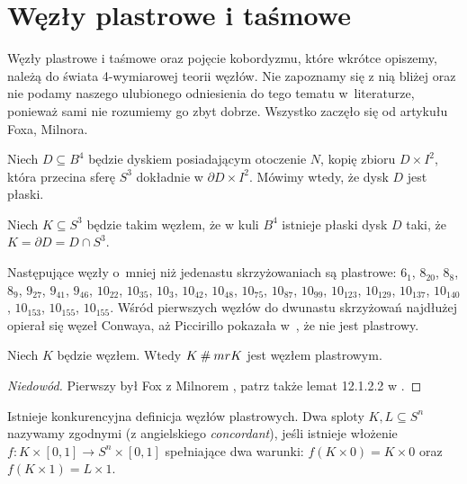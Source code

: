 \section{Węzły plastrowe i taśmowe} %
\label{sec:slice}
Węzły plastrowe i taśmowe oraz pojęcie kobordyzmu, które wkrótce opiszemy, należą do świata 4-wymiarowej teorii węzłów.
Nie zapoznamy się z nią bliżej oraz nie podamy naszego ulubionego odniesienia do tego tematu w~literaturze, ponieważ sami nie rozumiemy go zbyt dobrze.
Wszystko zaczęło się od artykułu \cite{fox66} Foxa, Milnora.

\begin{definition}[płaski]
    Niech $D \subseteq B^4$ będzie dyskiem posiadającym otoczenie $N$, kopię zbioru $D \times I
    ^2$, która przecina sferę $S^3$ dokładnie w $\partial D \times I^2$.
    Mówimy wtedy, że dysk $D$ jest płaski.
\end{definition}

\begin{definition}
    Niech $K \subseteq S^3$ będzie takim węzłem, że w kuli $B^4$ istnieje płaski dysk $D$ taki, że $K = \partial D = D \cap S^3$.
\end{definition}

Następujące węzły o~mniej niż jedenastu skrzyżowaniach są plastrowe: $6_1$, $8_{20}$, $8_{8}$, $8_{9}$, $9_{27}$, $9_{41}$, $9_{46}$, $10_{22}$, $10_{35}$, $10_{3}$, $10_{42}$, $10_{48}$, $10_{75}$, $10_{87}$, $10_{99}$, $10_{123}$, $10_{129}$, $10_{137}$, $10_{140}$, $10_{153}$, $10_{155}$, $10_{155}$.
Wśród pierwszych węzłów do dwunastu skrzyżowań najdłużej opierał się węzeł Conwaya, aż Piccirillo pokazała w~\cite{piccirillo20}, że nie jest plastrowy.

\begin{proposition}
    Niech $K$ będzie węzłem.
    Wtedy $K \mathbin{\#} mr K$ jest węzłem plastrowym.
\end{proposition}

\begin{proof}[Niedowód]
    Pierwszy był Fox z Milnorem \cite{fox66}, patrz także lemat 12.1.2.2 w \cite{kawauchi96}.
\end{proof}

Istnieje konkurencyjna definicja węzłów plastrowych.
Dwa sploty $K, L \subseteq S^n$ nazywamy zgodnymi (z angielskiego \emph{concordant}), jeśli istnieje włożenie $f \colon K \times [0,1] \to S^n \times [0,1]$ spełniające dwa warunki: $f(K \times 0) = K \times 0$ oraz $f(K \times 1) = L \times 1$.

